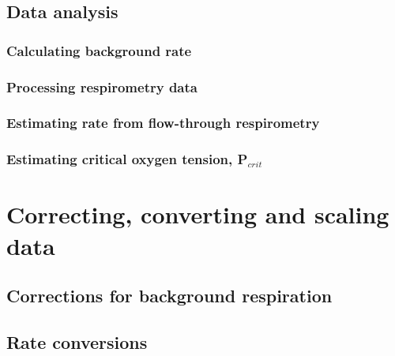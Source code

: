 \documentclass[
  oneside, 11pt, a4paper]{memoir}
\begin{document}
\hypertarget{data-analysis}{%
\subsection{Data analysis}\label{data-analysis}}

\hypertarget{calculating-background-rate}{%
\subsubsection{Calculating background rate}\label{calculating-background-rate}}

\hypertarget{processing-respirometry-data}{%
\subsubsection{Processing respirometry data}\label{processing-respirometry-data}}

\hypertarget{estimating-rate-from-flow-through-respirometry}{%
\subsubsection{Estimating rate from flow-through respirometry}\label{estimating-rate-from-flow-through-respirometry}}

\hypertarget{estimating-critical-oxygen-tension-p_crit}{%
\subsubsection{\texorpdfstring{Estimating critical oxygen tension, P\(_{crit}\)}{Estimating critical oxygen tension, P\_\{crit\}}}\label{estimating-critical-oxygen-tension-p_crit}}

\hypertarget{correcting-converting-and-scaling-data}{%
\section{Correcting, converting and scaling data}\label{correcting-converting-and-scaling-data}}

\hypertarget{corrections-for-background-respiration}{%
\subsection{Corrections for background respiration}\label{corrections-for-background-respiration}}

\hypertarget{rate-conversions}{%
\subsection{Rate conversions}\label{rate-conversions}}
\end{document}
